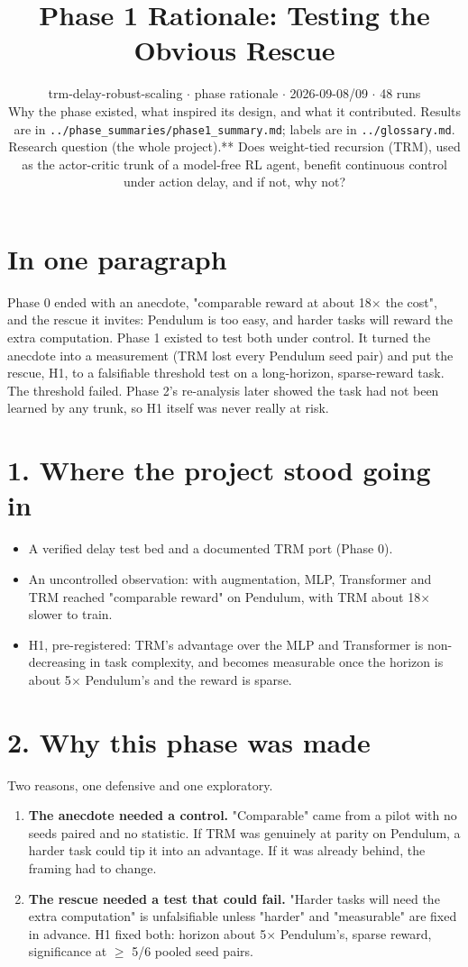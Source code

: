 \documentclass[11pt]{article}
\title{Phase 1 Rationale: Testing the Obvious Rescue}
\author{}
\date{trm-delay-robust-scaling $\cdot$ phase rationale $\cdot$ 2026-09-08/09 $\cdot$ 48 runs\\[2pt]Why the phase existed, what inspired its design, and what it contributed. Results are in \texttt{.\allowbreak{}.\allowbreak{}/\allowbreak{}phase\_\allowbreak{}summaries/\allowbreak{}phase1\_\allowbreak{}summary.\allowbreak{}md}; labels are in \texttt{.\allowbreak{}.\allowbreak{}/\allowbreak{}glossary.\allowbreak{}md}.\\[2pt]Research question (the whole project).** Does weight-tied recursion (TRM), used as the actor-critic trunk of a model-free RL agent, benefit continuous control under action delay, and if not, why not?}
\begin{document}
\maketitle
\section*{In one paragraph}



Phase 0 ended with an anecdote, "comparable reward at about 18$\times$ the cost", and the rescue it invites: Pendulum is too easy, and harder tasks will reward the extra computation. Phase 1 existed to test both under control. It turned the anecdote into a measurement (TRM lost every Pendulum seed pair) and put the rescue, H1, to a falsifiable threshold test on a long-horizon, sparse-reward task. The threshold failed. Phase 2's re-analysis later showed the task had not been learned by any trunk, so H1 itself was never really at risk.



\section*{1. Where the project stood going in}



\begin{itemize}
\item A verified delay test bed and a documented TRM port (Phase 0).
\item An uncontrolled observation: with augmentation, MLP, Transformer and TRM reached "comparable reward" on Pendulum, with TRM about 18$\times$ slower to train.
\item H1, pre-registered: TRM's advantage over the MLP and Transformer is non-decreasing in task complexity, and becomes measurable once the horizon is about 5$\times$ Pendulum's and the reward is sparse.
\end{itemize}



\section*{2. Why this phase was made}



Two reasons, one defensive and one exploratory.



\begin{enumerate}
\item \textbf{The anecdote needed a control.} "Comparable" came from a pilot with no seeds paired and no statistic. If TRM was genuinely at parity on Pendulum, a harder task could tip it into an advantage. If it was already behind, the framing had to change.
\item \textbf{The rescue needed a test that could fail.} "Harder tasks will need the extra computation" is unfalsifiable unless "harder" and "measurable" are fixed in advance. H1 fixed both: horizon about 5$\times$ Pendulum's, sparse reward, significance at $\geq$ 5/6 pooled seed pairs.
\end{enumerate}
\end{document}
